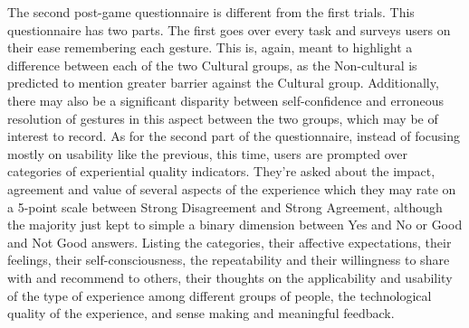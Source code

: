     The second post-game questionnaire is different from the first trials. This questionnaire has two parts. The first goes over every task and surveys users on their ease remembering each gesture. This is, again, meant to highlight a difference between each of the two Cultural groups, as the Non-cultural is predicted to mention greater barrier against the Cultural group. Additionally, there may also be a significant disparity between self-confidence and erroneous resolution of gestures in this aspect between the two groups, which may be of interest to record. As for the second part of the questionnaire, instead of focusing mostly on usability like the previous, this time, users are prompted over categories of experiential quality indicators. They’re asked about the impact, agreement and value of several aspects of the experience which they may rate on a 5-point scale between Strong Disagreement and Strong Agreement, although the majority just kept to simple a binary dimension between Yes and No or Good and Not Good answers. Listing the categories, their affective expectations, their feelings, their self-consciousness, the repeatability and their willingness to share with and recommend to others, their thoughts on the applicability and usability of the type of experience among different groups of people, the technological quality of the experience, and sense making and meaningful feedback.\\